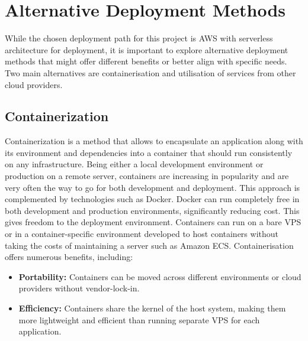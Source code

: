 \section{Alternative Deployment Methods}
\label{sec:alternative-deployment-methods}

While the chosen deployment path for this project is \ac{AWS} with serverless architecture for deployment, it is important to explore alternative deployment methods that might offer different benefits or better align with specific needs.
Two main alternatives are containerisation and utilisation of services from other cloud providers.


\subsection{Containerization}
\label{subsec:containerization}
Containerization is a method that allows to encapsulate an application along with its environment and dependencies into a container that should run consistently on any infrastructure. 
Being either a local development environment or production on a remote server, containers are increasing in popularity and are very often the way to go for both development and deployment.
This approach is complemented by technologies such as Docker.
Docker can run completely free in both development and production environments, significantly reducing cost.
This gives freedom to the deployment environment. 
Containers can run on a bare \ac{VPS} or in a container-specific environment developed to host containers without taking the costs of maintaining a server such as Amazon \ac{ECS}.
 Containerisation offers numerous benefits, including:
 \begin{itemize}
     \item \textbf{Portability:} Containers can be moved across different environments or cloud providers without vendor-lock-in.
     \item \textbf{Efficiency:} Containers share the kernel of the host system, making them more lightweight and efficient than running separate \ac{VPS} for each application.
 \end{itemize}


